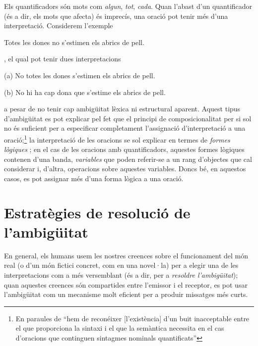 Els quantificadors són mots com \emph{algun}, \emph{tot}, \emph{cada}.
Quan l'abast d'un quantificador (és a dir, els mots que afecta) és imprecís, una oració pot tenir més
d'una interpretació. Considerem l'exemple 
\begin{exemple}
Totes les dones no s'estimen els abrics de pell.
\label{eq:abric}
\end{exemple}
\citep{hutchins92b}, el qual pot tenir dues interpretacions
\begin{exemple}
\item[(a)] No totes les dones s'estimen els abrics de pell.
\item[(b)] No hi ha cap dona que s'estime els abrics de pell.
\end{exemple}
a pesar de no tenir cap ambigüitat lèxica ni estructural aparent.
Aquest tipus d'ambigüitat es pot explicar pel fet que el principi de
composicionalitat per si sol no és suficient per a especificar
completament l'assignació d'interpretació a una oració;\footnote{En
  paraules de \citet[p.~364]{radford99b} ``hem de reconéixer
  [l'existència] d'un buit inacceptable entre el que proporciona la
  sintaxi i el que la semàntica necessita en el cas d'oracions que
  continguen sintagmes nominals quantificats''} la interpretació de les
oracions se sol explicar en termes de {\em
  formes lògiques} \citep[p.~357]{radford99b}; en el cas de les
oracions amb quantificadors, aquestes formes lògiques contenen d'una
banda, \emph{variables} que poden referir-se a un rang d'objectes que
cal considerar i, d'altra, operacions sobre aquestes variables.
Doncs bé, en aquestos casos, es pot assignar més d'una forma lògica a
una oració.




\section{Estratègies de resolució de l'ambigüitat}

En general, els humans usem les nostres creences sobre el funcionament
del món real (o d'un món fictici concret, com en una novel·la) per a
elegir una de les interpretacions com a més versemblant (és a dir, per
a \emph{resoldre l'ambigüitat}); quan aquestes creences són compartides
entre l'emissor i el receptor, es pot usar l'ambigüitat com un
mecanisme molt eficient per a produir missatges més curts.

